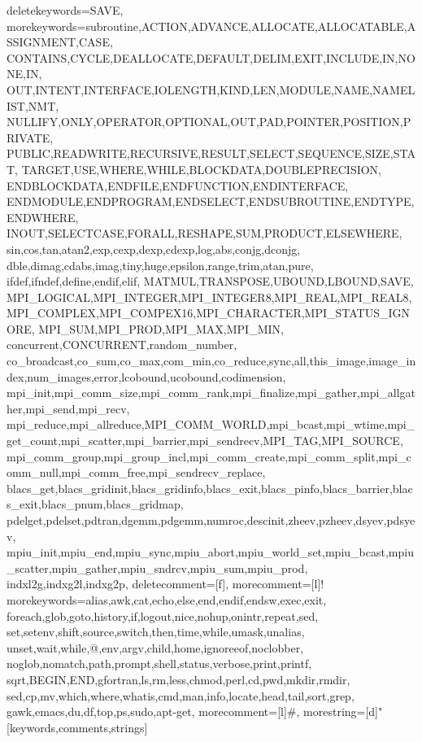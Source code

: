   {deletekeywords=SAVE,%
   morekeywords={subroutine,ACTION,ADVANCE,ALLOCATE,ALLOCATABLE,ASSIGNMENT,CASE,%
      CONTAINS,CYCLE,DEALLOCATE,DEFAULT,DELIM,EXIT,INCLUDE,IN,NONE,IN,%
      OUT,INTENT,INTERFACE,IOLENGTH,KIND,LEN,MODULE,NAME,NAMELIST,NMT,%
      NULLIFY,ONLY,OPERATOR,OPTIONAL,OUT,PAD,POINTER,POSITION,PRIVATE,%
      PUBLIC,READWRITE,RECURSIVE,RESULT,SELECT,SEQUENCE,SIZE,STAT,%
      TARGET,USE,WHERE,WHILE,BLOCKDATA,DOUBLEPRECISION,%
      ENDBLOCKDATA,ENDFILE,ENDFUNCTION,ENDINTERFACE,%
      ENDMODULE,ENDPROGRAM,ENDSELECT,ENDSUBROUTINE,ENDTYPE,ENDWHERE,%
      INOUT,SELECTCASE,FORALL,RESHAPE,SUM,PRODUCT,ELSEWHERE,%
      sin,cos,tan,atan2,exp,cexp,dexp,cdexp,log,abs,conjg,dconjg,%
      dble,dimag,cdabs,imag,tiny,huge,epsilon,range,trim,atan,pure,%
      ifdef,ifndef,define,endif,elif,%
      MATMUL,TRANSPOSE,UBOUND,LBOUND,SAVE,%
      MPI_LOGICAL,MPI_INTEGER,MPI_INTEGER8,MPI_REAL,MPI_REAL8,MPI_COMPLEX,MPI_COMPEX16,MPI_CHARACTER,MPI_STATUS_IGNORE,%
      MPI_SUM,MPI_PROD,MPI_MAX,MPI_MIN,%
      concurrent,CONCURRENT,random_number,%
      co_broadcast,co_sum,co_max,com_min,co_reduce,sync,all,this_image,image_index,num_images,error,lcobound,ucobound,codimension,%
      mpi_init,mpi_comm_size,mpi_comm_rank,mpi_finalize,mpi_gather,mpi_allgather,mpi_send,mpi_recv,%
      mpi_reduce,mpi_allreduce,MPI_COMM_WORLD,mpi_bcast,mpi_wtime,mpi_get_count,mpi_scatter,mpi_barrier,mpi_sendrecv,MPI_TAG,MPI_SOURCE,%
      mpi_comm_group,mpi_group_incl,mpi_comm_create,mpi_comm_split,mpi_comm_null,mpi_comm_free,mpi_sendrecv_replace,%
      blacs_get,blacs_gridinit,blacs_gridinfo,blacs_exit,blacs_pinfo,blacs_barrier,blacs_exit,blacs_pnum,blacs_gridmap,%
      pdelget,pdelset,pdtran,dgemm,pdgemm,numroc,descinit,zheev,pzheev,dsyev,pdsyev,%
      mpiu_init,mpiu_end,mpiu_sync,mpiu_abort,mpiu_world_set,mpiu_bcast,mpiu_scatter,mpiu_gather,mpiu_sndrcv,mpiu_sum,mpiu_prod,%
      indxl2g,indxg2l,indxg2p},%
   deletecomment=[f],%
   morecomment=[l]!%
  }%
  {morekeywords={alias,awk,cat,echo,else,end,endif,endsw,exec,exit,%
      foreach,glob,goto,history,if,logout,nice,nohup,onintr,repeat,sed,%
      set,setenv,shift,source,switch,then,time,while,umask,unalias,%
      unset,wait,while,@,env,argv,child,home,ignoreeof,noclobber,%
      noglob,nomatch,path,prompt,shell,status,verbose,print,printf,%
      sqrt,BEGIN,END,gfortran,ls,rm,less,chmod,perl,cd,pwd,mkdir,rmdir,%
      sed,cp,mv,which,where,whatis,cmd,man,info,locate,head,tail,sort,grep,%
      gawk,emacs,du,df,top,ps,sudo,apt-get},%
   morecomment=[l]\#,%
   morestring=[d]"%
  }[keywords,comments,strings]%

